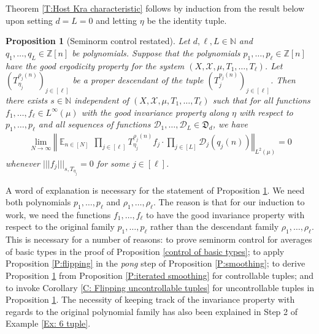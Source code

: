 \documentclass[11pt]{amsart}
\newtheorem{proposition}[lemma]{Proposition}
\theoremstyle{definition}
\newcommand{\N}{{\mathbb N}}
\newcommand{\Z}{{\mathbb Z}}
\newcommand{\CD}{{\mathcal D}}
\newcommand{\CX}{{\mathcal X}}
\newcommand{\FD}{{\mathfrak D}}
\newcommand{\norm}[1]{\left\Vert #1\right\Vert}
\newcommand{\nnorm}[1]{\lvert\!|\!| #1|\!|\!\rvert}
\DeclareMathOperator*{\E}{\mathbb{E}}
\newcommand{\brac}[1]{\mathopen{}\left( #1 \mathclose{}\right)}
\begin{document}
Theorem \ref{T:Host Kra characteristic} follows by induction from the result below upon setting  $d=L=0$ and letting $\eta$ be the identity tuple.
\begin{proposition}[Seminorm control restated]\label{P:Host Kra characteristic 2}
    Let $d, \ell, L\in\N$ and $q_1, \ldots, q_L\in\Z[n]$ be polynomials. Suppose that the polynomials $p_1, \ldots, p_\ell\in \Z[n]$ have the good ergodicity property for the system $(X,\CX, \mu,T_1, \ldots, T_\ell)$.  Let  $\brac{T_{\eta_{j}}^{\rho_{j}(n)}}_{j\in[\ell]}$ be a proper descendant of the tuple $\brac{T_j^{p_j(n)}}_{j\in[\ell]}$.
    Then there exists $s\in\N$ independent of  $(X,\CX, \mu,T_1, \ldots, T_\ell)$ such that for all functions $f_1, \ldots, f_\ell\in L^\infty(\mu)$ with the good invariance property along $\eta$ with respect to $p_1, \ldots, p_\ell$ and all sequences of functions $\CD_{1}, \ldots, \CD_L\in\FD_d$, we have
	\begin{align}\label{general average vanishes 2}
	    \lim_{N\to\infty}\norm{\E_{n\in [N]} \,\prod_{j\in[\ell]}T_{{\eta_j}}^{\rho_j(n)}f_j \cdot \prod_{j\in[L]}\CD_{j}(q_j(n))}_{L^2(\mu)} = 0
	\end{align}
	whenever $\nnorm{f_j}_{s, T_{\eta_j}} = 0$ for some $j\in[\ell]$.
\end{proposition}

A word of explanation is necessary for the statement of Proposition \ref{P:Host Kra characteristic 2}. We need both polynomials $p_1, \ldots, p_\ell$ and $\rho_1, \ldots, \rho_\ell$. The reason is that for our induction to work, we need the functions $f_1, \ldots, f_\ell$ to have the good invariance property with respect to the original family $p_1, \ldots, p_\ell$ rather than the descendant family $\rho_1, \ldots, \rho_\ell$. This is necessary for a number of reasons: to prove seminorm control for averages of basic types in the proof of Proposition \ref{control of basic types}; to apply Proposition \ref{P:flipping} in the \textit{pong} step of Proposition \ref{P:smoothing}; to derive Proposition \ref{P:Host Kra characteristic 2} from Proposition \ref{P:iterated smoothing} for controllable tuples; and to invoke Corollary \ref{C: Flipping uncontrollable tuples} for uncontrollable tuples in Proposition \ref{P:Host Kra characteristic 2}.
The necessity of keeping track of the invariance property with regards to the original polynomial family has also been explained in Step 2 of Example \ref{Ex: 6 tuple}.
\end{document}
